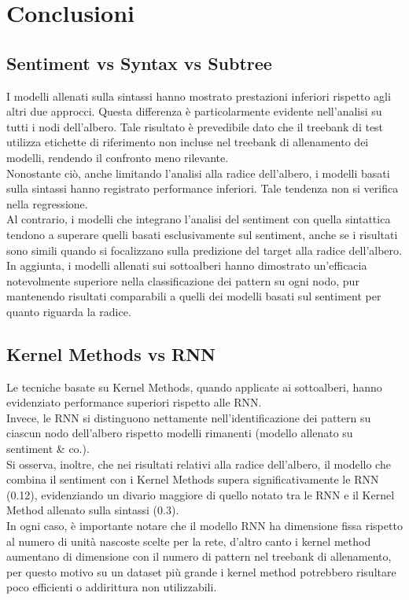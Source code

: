 \section{Conclusioni}

\subsection{Sentiment vs Syntax vs Subtree}

I modelli allenati sulla sintassi hanno mostrato prestazioni inferiori 
rispetto agli altri due approcci. Questa differenza è particolarmente evidente 
nell'analisi su tutti i nodi dell'albero. Tale risultato è prevedibile dato 
che il treebank di test utilizza etichette di riferimento non incluse
nel treebank di allenamento dei modelli, rendendo il confronto meno rilevante.\\
Nonostante ciò, anche limitando l'analisi alla radice dell'albero, i modelli 
basati sulla sintassi hanno registrato performance inferiori. Tale tendenza non 
si verifica nella regressione. \\
Al contrario, i modelli che integrano l'analisi del sentiment con quella
sintattica tendono a superare quelli basati esclusivamente sul sentiment, anche
se i risultati sono simili quando si focalizzano sulla predizione del target
alla radice dell'albero.\\
In aggiunta, i modelli allenati sui sottoalberi hanno dimostrato un'efficacia
notevolmente superiore nella classificazione dei pattern su ogni nodo, pur
mantenendo risultati comparabili a quelli dei modelli basati sul sentiment per
quanto riguarda la radice.

\subsection{Kernel Methods vs RNN}

Le tecniche basate su Kernel Methods, quando applicate ai sottoalberi, hanno
evidenziato performance superiori rispetto alle RNN. \\
Invece, le RNN si distinguono nettamente nell'identificazione dei pattern su 
ciascun nodo dell'albero rispetto modelli rimanenti (modello allenato su 
sentiment \& co.).\\
Si osserva, inoltre, che nei risultati relativi alla radice dell'albero, il
modello che combina il sentiment con i Kernel Methods supera
significativamente le RNN (0.12), evidenziando un divario maggiore di quello 
notato tra le RNN e il Kernel Method allenato sulla sintassi (0.3).\\
In ogni caso, è importante notare che il modello RNN ha dimensione fissa
rispetto al numero di unità nascoste scelte per la rete, d'altro canto i kernel
method aumentano di dimensione con il numero di pattern nel treebank di
allenamento, per questo motivo su un dataset più grande i kernel method
potrebbero risultare poco efficienti o addirittura non utilizzabili.

